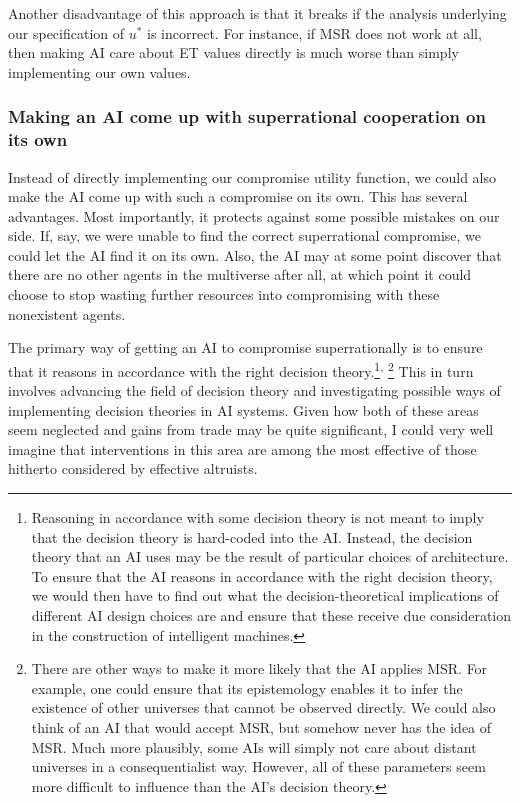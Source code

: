 Another disadvantage of this approach is that it breaks if the analysis
underlying our specification of \(u^{*}\) is incorrect. For instance, if
MSR does not work at all, then making AI care about ET values directly
is much worse than simply implementing our own values.

\hypertarget{making-an-ai-come-up-with-superrational-cooperation-on-its-own}{\subsubsection{Making
an AI come up with superrational cooperation on its
own}\label{making-an-ai-come-up-with-superrational-cooperation-on-its-own}}

Instead of directly implementing our compromise utility function, we
could also make the AI come up with such a compromise on its own. This
has several advantages. Most importantly, it protects against some
possible mistakes on our side. If, say, we were unable to find the
correct superrational compromise, we could let the AI find it on its
own. Also, the AI may at some point discover that there are no other
agents in the multiverse after all, at which point it could choose to
stop wasting further resources into compromising with these nonexistent
agents.

The primary way of getting an AI to compromise superrationally is to
ensure that it reasons in accordance with the right decision
theory.\footnote{Reasoning in accordance with some decision theory is
  not meant to imply that the decision theory is hard-coded into the AI.
  Instead, the decision theory that an AI uses may be the result of
  particular choices of architecture. To ensure that the AI reasons in
  accordance with the right decision theory, we would then have to find
  out what the decision-theoretical implications of different AI design
  choices are and ensure that these receive due consideration in the
  construction of intelligent machines.}\textsuperscript{, }\footnote{There are other ways
  to make it more likely that the AI applies MSR. For example, one could
  ensure that its epistemology enables it to infer the existence of
  other universes that cannot be observed directly. We could also think
  of an AI that would accept MSR, but somehow never has the idea of MSR.
  Much more plausibly, some AIs will simply not care about distant
  universes in a consequentialist way. However, all of these parameters
  seem more difficult to influence than the AI's decision theory.} This
in turn involves advancing the field of decision theory and
investigating possible ways of implementing decision theories in AI
systems. Given how both of these areas seem neglected and gains from
trade may be quite significant, I could very well imagine that
interventions in this area are among the most effective of those
hitherto considered by effective altruists.

